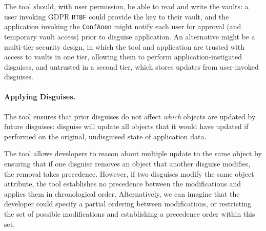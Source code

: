 The tool should, with user permission, be able to read and write the vaults: a user invoking GDPR
\texttt{RTBF} could provide the key to their vault, and the application invoking the
\texttt{ConfAnon} might notify each user for approval (and temporary vault access) prior to disguise
application. An alternative might be a multi-tier security design, in which the tool and application
are trusted with access to vaults in one tier, allowing them to perform application-instigated
disguises, and untrusted in a second tier, which stores updates from user-invoked disguises.


\paragraph{Applying Disguises.}
The tool ensures that prior disguises do not affect \emph{which} objects are updated by future
disguises: disguise will update all objects that it would have updated if performed on the original,
undisguised state of application data. 

The tool allows developers to reason about multiple update to the same object by ensuring that 
if one disguise removes an object that another disguise modifies, the removal takes
precedence.
%
However, if two disguises modify the same object attribute, the tool
establishes no precedence between the modifications and applies them in chronological order.
Alternatively, we can imagine that the developer could specify a partial ordering between
modifications, or restricting the set of possible modifications and establishing a precedence order
within this set.

